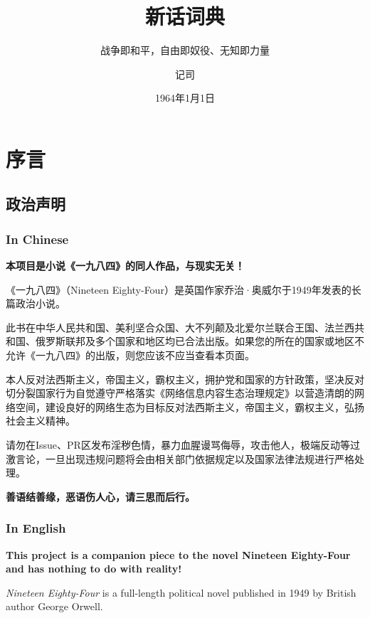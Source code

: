 \documentclass[lang=cn, color=black]{elegantbook}
\title{新话词典}
\subtitle{战争即和平，自由即奴役、无知即力量}
\date{1964年1月1日}
\author{记司}
\institute{真部}
\begin{document}
    \maketitle

    \tableofcontents

    \part*{序言}
        \chapter*{政治声明}
            \section*{In Chinese}
                \textbf{本项目是小说《一九八四》的同人作品，与现实无关！}

                《一九八四》（Nineteen Eighty-Four）是英国作家乔治·奥威尔于1949年发表的长篇政治小说。

                此书在中华人民共和国、美利坚合众国、大不列颠及北爱尔兰联合王国、法兰西共和国、俄罗斯联邦及多个国家和地区均已合法出版。如果您的所在的国家或地区不允许《一九八四》的出版，则您应该不应当查看本页面。

                本人反对法西斯主义，帝国主义，霸权主义，拥护党和国家的方针政策，坚决反对切分裂国家行为自觉遵守严格落实《网络信息内容生态治理规定》以营造清朗的网络空间，建设良好的网络生态为目标反对法西斯主义，帝国主义，霸权主义，弘扬社会主义精神。

                请勿在Issue、PR区发布淫秽色情，暴力血腥谩骂侮辱，攻击他人，极端反动等过激言论，一旦出现违规问题将会由相关部门依据规定以及国家法律法规进行严格处理。
                
                \begin{center}
                    \large
                    \textbf{善语结善缘，恶语伤人心，请三思而后行。}
                \end{center}
            
            \section*{In English}
                \textbf{This project is a companion piece to the novel Nineteen Eighty-Four and has nothing to do with reality!}

                \textit{Nineteen Eighty-Four} is a full-length political novel published in 1949 by British author George Orwell.
\end{document}
